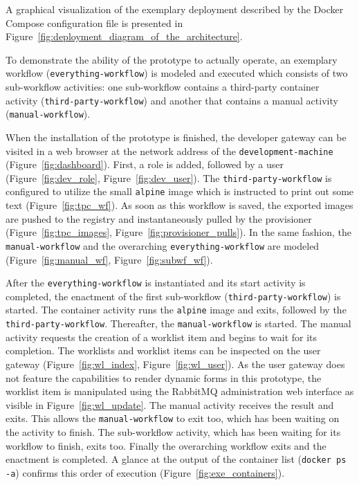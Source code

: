   A graphical visualization of the exemplary deployment described by the Docker Compose configuration file is presented in Figure~\ref{fig:deployment_diagram_of_the_architecture}.

  To demonstrate the ability of the prototype to actually operate, an exemplary workflow (\texttt{everything-workflow}) is modeled and executed which consists of two sub-workflow activities: one sub-workflow contains a third-party container activity (\texttt{third-party-workflow}) and another that contains a manual activity (\texttt{manual-workflow}).

  When the installation of the prototype is finished, the developer gateway can be visited in a web browser at the network address of the \texttt{development-machine} (Figure~\ref{fig:dashboard}). First, a role is added, followed by a user (Figure~\ref{fig:dev_role}, Figure~\ref{fig:dev_user}). The \texttt{third-party-workflow} is configured to utilize the small \texttt{alpine} image which is instructed to print out some text (Figure~\ref{fig:tpc_wf}). As soon as this workflow is saved, the exported images are pushed to the registry and instantaneously pulled by the provisioner (Figure~\ref{fig:tpc_images}, Figure~\ref{fig:provisioner_pulls}). In the same fashion, the \texttt{manual-workflow} and the overarching \texttt{everything-workflow} are modeled (Figure~\ref{fig:manual_wf}, Figure~\ref{fig:subwf_wf}).

  After the \texttt{everything-workflow} is instantiated and its start activity is completed, the enactment of the first sub-workflow (\texttt{third-party-workflow}) is started. The container activity runs the \texttt{alpine} image and exits, followed by the \texttt{third-party-workflow}. Thereafter, the \texttt{manual-workflow} is started. The manual activity requests the creation of a worklist item and begins to wait for its completion. The worklists and worklist items can be inspected on the user gateway (Figure~\ref{fig:wl_index}, Figure~\ref{fig:wl_user}). As the user gateway does not feature the capabilities to render dynamic forms in this prototype, the worklist item is manipulated using the RabbitMQ administration web interface as visible in Figure~\ref{fig:wl_update}. The manual activity receives the result and exits. This allows the \texttt{manual-workflow} to exit too, which has been waiting on the activity to finish. The sub-workflow activity, which has been waiting for its workflow to finish, exits too. Finally the overarching workflow exits and the enactment is completed. A glance at the output of the container list (\texttt{docker ps -a}) confirms this order of execution (Figure~\ref{fig:exe_containers}).

